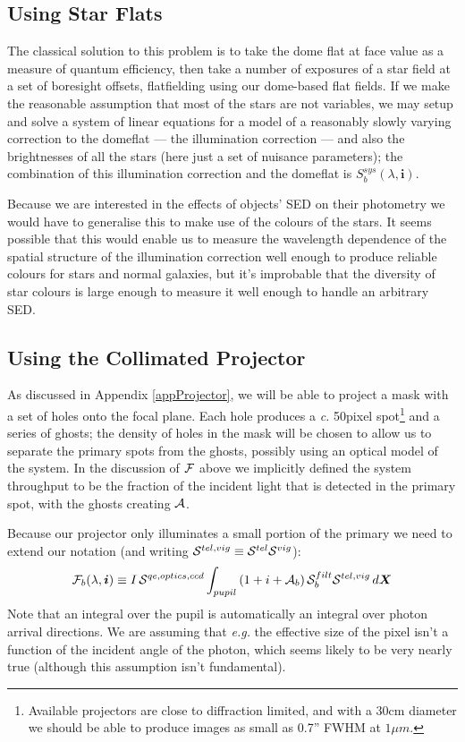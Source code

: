 \documentclass[12pt]{article}
\renewcommand{\c}{\textit{c.}\xspace}
\newcommand{\eg}{\textit{e.g.}\xspace}
\newcommand{\ib}{{\boldsymbol i}}
\newcommand{\Xb}{{\boldsymbol X}}
\newcommand{\Flat}{{\cal F}}
\newcommand{\additive}{{\cal A}}
\newcommand{\qe}{{\cal S}}
\begin{document}
\subsection{Using Star Flats}
\label{secStarFlats}

The classical solution to this problem is to take the dome flat at face value as a measure of quantum
efficiency, then take a number of exposures of a star field at a set of boresight offsets, flatfielding using
our dome-based flat fields.  If we make the reasonable assumption that most of the stars are not variables, we
may setup and solve a system of linear equations for a model of a reasonably slowly varying correction to the
domeflat --- the illumination correction --- and also the brightnesses of all the stars (here just a set of
nuisance parameters); the combination of this illumination correction and the domeflat is $S_b^{sys}(\lambda, \ib)$.

Because we are interested in the effects of objects' SED on their photometry we would have to generalise this
to make use of the colours of the stars.  It seems possible that this would enable us to measure the
wavelength dependence of the spatial structure of the illumination correction well enough to produce reliable
colours for stars and normal galaxies, but it's improbable that the diversity of star colours is large enough
to measure it well enough to handle an arbitrary SED.

\subsection{Using the Collimated Projector}
\label{secProjector}

As discussed in Appendix \ref{appProjector}, we will be able to project a mask with a set of holes onto the
focal plane.  Each hole produces a \c 50pixel spot\footnote{Available projectors are close to diffraction
  limited, and with a 30cm diameter we should be able to produce images as small as 0.7'' FWHM at $1\mu m$.
  }
  and a series of ghosts;  the density of holes in the
mask will be chosen to allow us to separate the primary spots from the ghosts, possibly using an optical model
of the system.  In the discussion of $\Flat$ above we implicitly defined the system throughput to be the
fraction of the incident light that is detected in the primary spot, with the ghosts creating $\additive$.

Because our projector only illuminates a small portion of the primary we need to extend
our notation (and writing $\qe^{tel, vig} \equiv \qe^{tel} \qe^{vig}$):
$$
\Flat_b(\lambda, \ib) \equiv I\, \qe^{qe, optics, ccd} \int_{pupil} \left(
                                                                1 + i + \additive_b
                                              \right) \qe_b^{filt} \qe^{tel, vig}\, d\Xb
$$
Note that an integral over the pupil is automatically an integral over photon arrival directions.  We
are assuming that \eg the effective size of the pixel isn't a function of the incident angle of the photon,
which seems likely to be very nearly true (although this assumption isn't fundamental).
\end{document}
